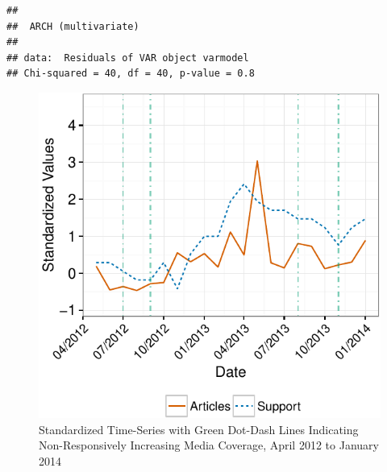 \documentclass[12pt,]{article}
\makeatletter
\def\maxwidth{\ifdim\Gin@nat@width>\linewidth\linewidth
\else\Gin@nat@width\fi}
\let\Oldincludegraphics\includegraphics
\renewcommand{\includegraphics}[1]{\Oldincludegraphics[width=\maxwidth]{#1}}
\makeatother
\begin{document}
\begin{verbatim}
## 
##  ARCH (multivariate)
## 
## data:  Residuals of VAR object varmodel
## Chi-squared = 40, df = 40, p-value = 0.8
\end{verbatim}

\newpage

\begin{figure}[htbp]
\centering
\includegraphics{ukip_media_files/figure-latex/qual-zoomed-plot-1.pdf}
\caption{Standardized Time-Series with Green Dot-Dash Lines Indicating
Non-Responsively Increasing Media Coverage, April 2012 to January 2014}
\end{figure}

\newpage


\end{document}
